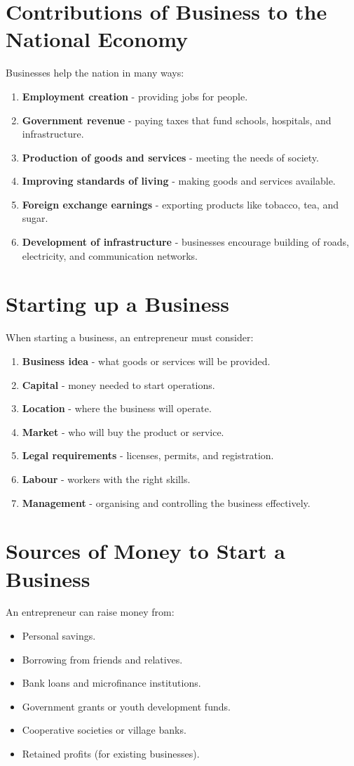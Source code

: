 \documentclass[12pt,a4paper, openany]{book}
\begin{document}
\section{Contributions of Business to the National Economy}
Businesses help the nation in many ways:
\begin{enumerate}
	\item \textbf{Employment creation} - providing jobs for people.
	\item \textbf{Government revenue} - paying taxes that fund schools, hospitals, and infrastructure.
	\item \textbf{Production of goods and services} - meeting the needs of society.
	\item \textbf{Improving standards of living} - making goods and services available.
	\item \textbf{Foreign exchange earnings} - exporting products like tobacco, tea, and sugar.
	\item \textbf{Development of infrastructure} - businesses encourage building of roads, electricity, and communication networks.
\end{enumerate}

\section{Starting up a Business}
When starting a business, an entrepreneur must consider:
\begin{enumerate}
	\item \textbf{Business idea} - what goods or services will be provided.
	\item \textbf{Capital} - money needed to start operations.
	\item \textbf{Location} - where the business will operate.
	\item \textbf{Market} - who will buy the product or service.
	\item \textbf{Legal requirements} - licenses, permits, and registration.
	\item \textbf{Labour} - workers with the right skills.
	\item \textbf{Management} - organising and controlling the business effectively.
\end{enumerate}

\section{Sources of Money to Start a Business}
An entrepreneur can raise money from:
\begin{itemize}
	\item Personal savings.
	\item Borrowing from friends and relatives.
	\item Bank loans and microfinance institutions.
	\item Government grants or youth development funds.
	\item Cooperative societies or village banks.
	\item Retained profits (for existing businesses).
\end{itemize}
\end{document}
